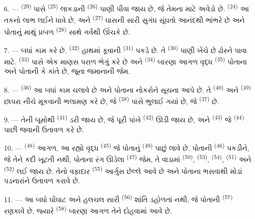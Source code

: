 6. ---  \textsuperscript{(29)} પાસે 
\textsuperscript{(25)} લાકડાની  \textsuperscript{(26)}
પાણી પીવા જાય છે, જે તેમના માટે અવેડો છે. 
\textsuperscript{(24)} આ તકનો લાભ લઈને ધાવે છે, અને 
\textsuperscript{(27)} ઘાસની સારી સુગંધ સૂંઘતો આનંદથી ભાંભરે છે અને
પોતાનું માથું પ્રબળ  \textsuperscript{(28)} સાથે
ગર્વથી ઊંચકે છે.

7. --- બધાં કામ કરે છે.  \textsuperscript{(32)} હાથમાં
કૂવાની  \textsuperscript{(31)} પકડે છે. તે 
\textsuperscript{(30)} પાણી ખેંચે છે ઢોરને પાવા માટે. 
\textsuperscript{(33)} પાસે એક માણસ પરાળ ભેગું કરે છે અને 
\textsuperscript{(34)} બારણા આગળ વૃદ્ધ 
\textsuperscript{(35)} પોતાના  અને પોતાની
  કે  કાંતે છે, જૂના જમાનાની
જેમ.

\VUsaut{3.0mm}
\VUsaut{3.0mm}

8. ---  \textsuperscript{(36)} આ બધાં કામ ચલાવે છે અને
પોતાના નોકરોને સૂચના આપે છે. તે  \textsuperscript{(40)}
અને  \textsuperscript{(39)} છાપરા નીચે મૂકવાની ભલામણ કરે
છે, જે  \textsuperscript{(38)} પાસે
ભુલાઈ ગયાં છે, જે  \textsuperscript{(37)} છે.

9. --- તેની બૂમોથી  \textsuperscript{(41)} ડરી જાય છે,
જે પૂરી પાંખે  \textsuperscript{(42)} ઊડી જાય છે,
અને  \textsuperscript{(43)} જે 
\textsuperscript{(44)} પાછી જવાની ઉતાવળ કરે છે.

10. ---  \textsuperscript{(48)} આગળ, આ રહ્યો વૃદ્ધ
 \textsuperscript{(45)} જે પોતાનું 
\textsuperscript{(49)} પાછું લાવે છે. પોતાની 
\textsuperscript{(46)} પકડીને, જે તેને કદી ખૂટતી નથી, પોતાના રંગ
ઊડેલા  \textsuperscript{(47)} જેમ, તે વાડામાં
 \textsuperscript{(50)}, 
\textsuperscript{(53)},  \textsuperscript{(54)},
 \textsuperscript{(51)} અને 
\textsuperscript{(52)} લઈ જાય છે. તેનો વફાદાર 
\textsuperscript{(55)} આર્ગુસ છેલ્લે આવે છે અને પોતાના ભસવાથી
મોડાં પડનારાંને ઉતાવળ કરાવે છે.

11. --- આ બધો ઘોંઘાટ અને હલચલ સારી 
\textsuperscript{(56)} શાંતિ ડહોળતાં નથી, જે પોતાની 
\textsuperscript{(57)} રણકાવે છે, જ્યારે 
\textsuperscript{(58)} બારણા આગળ તેને દોહવામાં આવે છે.

